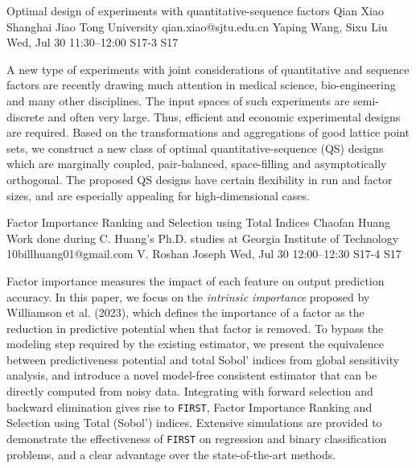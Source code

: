 \begin{talk}
  {Optimal design of experiments with quantitative-sequence factors}%
  {Qian Xiao}%
  {Shanghai Jiao Tong University}%
  {qian.xiao@sjtu.edu.cn}%
  {Yaping Wang, Sixu Liu}%
  {}%
  {Wed, Jul 30 11:30–12:00}%
  {S17-3}%
  {S17}%
  
				
			
A new type of experiments with joint considerations of quantitative and sequence factors are recently drawing much attention in medical science, bio-engineering and many other disciplines. The input spaces of such experiments are semi-discrete and often very large. Thus, efficient and economic experimental designs are required. Based on the transformations and aggregations of good lattice point sets, we construct a new class of optimal quantitative-sequence (QS) designs which are marginally coupled, pair-balanced, space-filling and asymptotically orthogonal. The proposed QS designs have certain flexibility in run and factor sizes, and are especially appealing for high-dimensional cases.

\end{talk}

\begin{talk}
  {Factor Importance Ranking and Selection using Total Indices}%
  {Chaofan Huang}%
  {Work done during C. Huang's Ph.D. studies at Georgia Institute of Technology}%
  {10billhuang01@gmail.com}%
  {V. Roshan Joseph}%
  {}%
  {Wed, Jul 30 12:00–12:30}%
  {S17-4}%
  {S17}%
  
				
			
Factor importance measures the impact of each feature on output prediction accuracy. In this paper, we focus on the \emph{intrinsic importance} proposed by Williamson et al. (2023), which defines the importance of a factor as the reduction in predictive potential when that factor is removed. To bypass the modeling step required by the existing estimator, we present the equivalence between predictiveness potential and total Sobol' indices from global sensitivity analysis, and introduce a novel model-free consistent estimator that can be directly computed from noisy data. Integrating with forward selection and backward elimination gives rise to \texttt{FIRST}, Factor Importance Ranking and Selection using Total (Sobol') indices. Extensive simulations are provided to demonstrate the effectiveness of \texttt{FIRST} on regression and binary classification problems, and a clear advantage over the state-of-the-art methods.
\end{talk}

